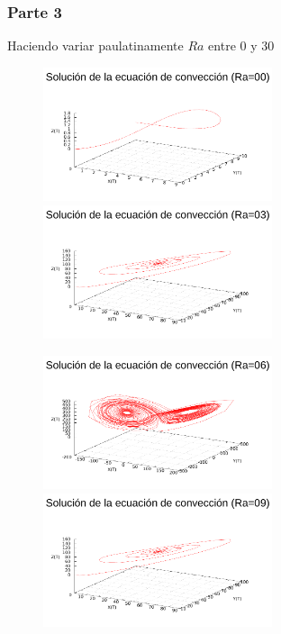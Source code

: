 
\subsubsection{Parte 3}
Haciendo variar paulatinamente $Ra$ entre 0 y 30

\begin{figure} [H]
\hspace{-1cm} \includegraphics[width=0.6\textwidth]{./parte4/graficos/grafico_P3_3d_ra00.pdf}\includegraphics[width=0.6\textwidth]{./parte4/graficos/grafico_P3_3d_ra03.pdf}
\caption{} 
\end{figure}

\begin{figure} [H]
\hspace{-1cm} \includegraphics[width=0.6\textwidth]{./parte4/graficos/grafico_P3_3d_ra06.pdf}\includegraphics[width=0.6\textwidth]{./parte4/graficos/grafico_P3_3d_ra09.pdf}
\caption{} 
\end{figure}

